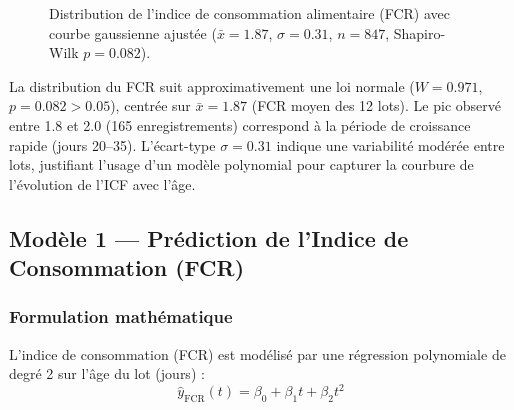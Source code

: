 \begin{figure}[H]
\centering
{}
\caption{Distribution de l'indice de consommation alimentaire (FCR) avec courbe gaussienne
ajustée ($\bar{x}=1.87$, $\sigma=0.31$, $n=847$, Shapiro-Wilk $p=0.082$).}
\label{fig:fcr_hist}
\end{figure}

\noindent
La distribution du FCR suit approximativement une loi normale
($W = 0.971$, $p = 0.082 > 0.05$), centrée sur $\bar{x} = 1.87$ (FCR moyen
des 12 lots). Le pic observé entre 1.8 et 2.0 (165 enregistrements) correspond
à la période de croissance rapide (jours 20--35). L'écart-type $\sigma = 0.31$
indique une variabilité modérée entre lots, justifiant l'usage d'un modèle
polynomial pour capturer la courbure de l'évolution de l'ICF avec l'âge.

\subsection{Modèle 1 --- Prédiction de l'Indice de Consommation (FCR)}

\subsubsection{Formulation mathématique}

L'indice de consommation (FCR) est modélisé par une régression polynomiale
de degré 2 sur l'âge du lot (jours) :
\begin{equation}
\hat{y}_\text{FCR}(t) = \beta_0 + \beta_1 t + \beta_2 t^2
\label{eq:fcr_poly}
\end{equation}

